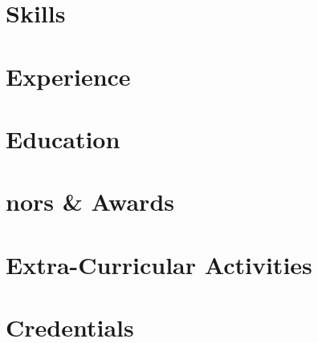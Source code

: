 \documentclass[letter,10pt]{article}
\begin{document}


\section{Skills}


\section{Experience}


\section{Education}


\section{nors \& Awards}


\section{Extra-Curricular Activities}


\section{Credentials}
% 

\end{document}
